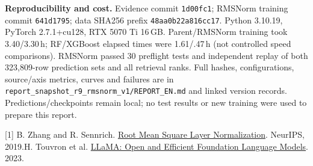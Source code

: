 \documentclass[10pt,a4paper]{article}
\newcommand{\sub}[1]{\textbf{#1}\enspace}
\begin{document}
\sub{Reproducibility and cost.}
Evidence commit \texttt{1d00fc1}; RMSNorm training commit \texttt{641d1795}; data SHA256 prefix \texttt{48aa0b22a816cc17}. Python 3.10.19, PyTorch 2.7.1+cu128, RTX 5070 Ti 16\,GB. Parent/RMSNorm training took 3.40/3.30\,h; RF/XGBoost elapsed times were 1.61/.47\,h (not controlled speed comparisons). RMSNorm passed 30 preflight tests and independent replay of both 323,809-row prediction sets and all retrieval ranks. Full hashes, configurations, source/axis metrics, curves and failures are in \texttt{report\_snapshot\_r9\_rmsnorm\_v1/REPORT\_EN.md} and linked version records. Predictions/checkpoints remain local; no test results or new training were used to prepare this report.

{\footnotesize
[1] B. Zhang and R. Sennrich. \href{https://arxiv.org/abs/1910.07467}{Root Mean Square Layer Normalization}. NeurIPS, 2019.\quad
[2] H. Touvron et al. \href{https://arxiv.org/abs/2302.13971}{LLaMA: Open and Efficient Foundation Language Models}. 2023.
}
\end{document}
